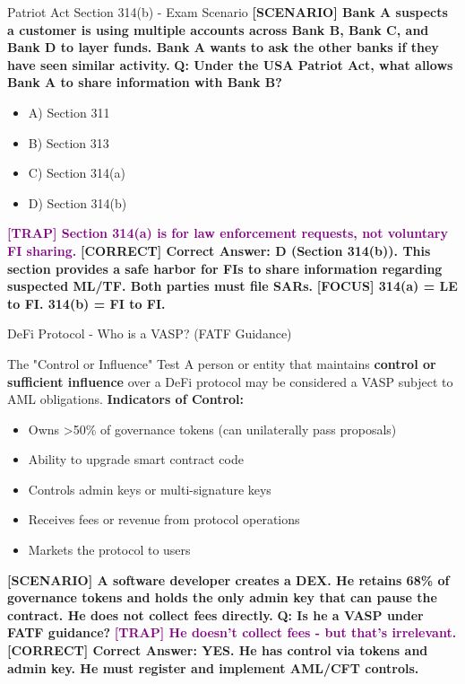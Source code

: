 \documentclass[11pt,a4paper]{beamer}
\newcommand{\examfocus}[1]{\textcolor{orange!80!black}{\textbf{[FOCUS] #1}}}
\newcommand{\trap}[1]{\textcolor{purple}{\textbf{[TRAP] #1}}}
\newcommand{\correct}[1]{\textcolor{green!50!black}{\textbf{[CORRECT] #1}}}
\newcommand{\scenario}[1]{\textcolor{blue!70!black}{\textbf{[SCENARIO] #1}}}
\begin{document}
\begin{frame}{Patriot Act Section 314(b) - Exam Scenario}
\scenario{Bank A suspects a customer is using multiple accounts across Bank B, Bank C, and Bank D to layer funds. Bank A wants to ask the other banks if they have seen similar activity.}
\vspace{0.2cm}
\textbf{Q: Under the USA Patriot Act, what allows Bank A to share information with Bank B?}
\begin{itemize}
\item A) Section 311
\item B) Section 313
\item C) Section 314(a)
\item D) Section 314(b)
\end{itemize}
\trap{Section 314(a) is for law enforcement requests, not voluntary FI sharing.}
\correct{Correct Answer: D (Section 314(b)). This section provides a safe harbor for FIs to share information regarding suspected ML/TF. Both parties must file SARs.}
\examfocus{314(a) = LE to FI. 314(b) = FI to FI.}
\end{frame}


\begin{frame}{DeFi Protocol - Who is a VASP? (FATF Guidance)}
\begin{block}{The "Control or Influence" Test}
A person or entity that maintains \textbf{control or sufficient influence} over a DeFi protocol may be considered a VASP subject to AML obligations.
\vspace{0.2cm}
\textbf{Indicators of Control:}
\begin{itemize}
\item Owns >50\% of governance tokens (can unilaterally pass proposals)
\item Ability to upgrade smart contract code
\item Controls admin keys or multi-signature keys
\item Receives fees or revenue from protocol operations
\item Markets the protocol to users
\end{itemize}
\end{block}
\scenario{A software developer creates a DEX. He retains 68\% of governance tokens and holds the only admin key that can pause the contract. He does not collect fees directly.}
\vspace{0.1cm}
\textbf{Q: Is he a VASP under FATF guidance?}
\trap{He doesn't collect fees - but that's irrelevant.}
\correct{Correct Answer: YES. He has control via tokens and admin key. He must register and implement AML/CFT controls.}
\end{frame}
\end{document}
